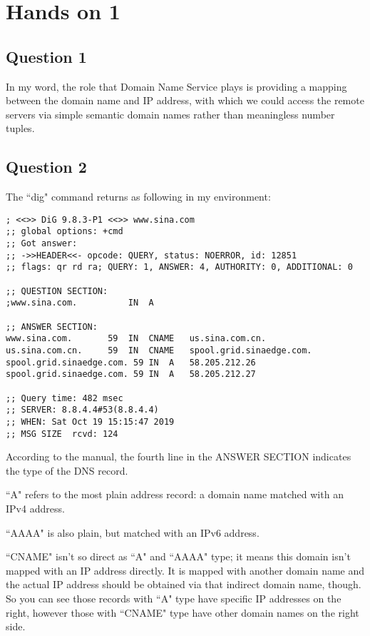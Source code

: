 \documentclass{article}
\begin{document}
\section*{Hands on 1}

\subsection*{Question 1}

In my word, the role that Domain Name Service plays is providing a mapping between the domain name and IP address, with which we could access the remote servers via simple semantic domain names rather than meaningless number tuples.

\subsection*{Question 2}

The ``dig" command returns as following in my environment:

\begin{lstlisting}[numberstyle=\tiny\monaco,
        basicstyle=\small\monaco]
; <<>> DiG 9.8.3-P1 <<>> www.sina.com
;; global options: +cmd
;; Got answer:
;; ->>HEADER<<- opcode: QUERY, status: NOERROR, id: 12851
;; flags: qr rd ra; QUERY: 1, ANSWER: 4, AUTHORITY: 0, ADDITIONAL: 0

;; QUESTION SECTION:
;www.sina.com.			IN	A

;; ANSWER SECTION:
www.sina.com.		59	IN	CNAME	us.sina.com.cn.
us.sina.com.cn.		59	IN	CNAME	spool.grid.sinaedge.com.
spool.grid.sinaedge.com. 59	IN	A	58.205.212.26
spool.grid.sinaedge.com. 59	IN	A	58.205.212.27

;; Query time: 482 msec
;; SERVER: 8.8.4.4#53(8.8.4.4)
;; WHEN: Sat Oct 19 15:15:47 2019
;; MSG SIZE  rcvd: 124
\end{lstlisting}

According to the manual, the fourth line in the ANSWER SECTION indicates the type of the DNS record.

``A" refers to the most plain address record: a domain name matched with an IPv4 address.

``AAAA" is also plain, but matched with an IPv6 address.

``CNAME" isn't so direct as ``A" and ``AAAA" type; it means this domain isn't mapped with an IP address directly. It is mapped with another domain name and the actual IP address should be obtained via that indirect domain name, though. So you can see those records with ``A" type have specific IP addresses on the right, however those with ``CNAME" type have other domain names on the right side.
\end{document}
